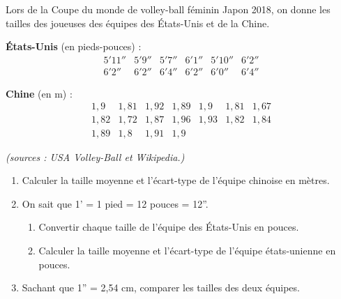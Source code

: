 \begin{exo}
	Lors de la Coupe du monde de volley-ball féminin Japon 2018, on donne les tailles des joueuses des équipes des États-Unis et de la Chine.

	\textbf{États-Unis} (en pieds-pouces) :
	\[
		\begin{array}{cccccc}
			5'11'' & 5'9'' & 5'7'' & 6'1'' & 5'10'' & 6'2'' \\
			6'2''  & 6'2'' & 6'4'' & 6'2'' & 6'0''  & 6'4''
		\end{array}
	\]

	\textbf{Chine} (en m) :
	\[
		\begin{array}{ccccccc}
			1,9  & 1,81 & 1,92 & 1,89 & 1,9  & 1,81 & 1,67 \\
			1,82 & 1,72 & 1,87 & 1,96 & 1,93 & 1,82 & 1,84 \\
			1,89 & 1,8  & 1,91 & 1,9  &      &      &
		\end{array}
	\]

	\hfill{\footnotesize\textit{(sources : USA Volley-Ball et Wikipedia.)}}

	\begin{enumerate}
		\item Calculer la taille moyenne et l'écart-type de l'équipe chinoise en mètres.
		\item On sait que 1' = 1 pied = 12 pouces = 12''.
		      \begin{enumerate}
			      \item Convertir chaque taille de l'équipe des États-Unis en pouces.
			      \item Calculer la taille moyenne et l'écart-type de l'équipe états-unienne en pouces.
		      \end{enumerate}
		\item Sachant que 1'' = 2,54 cm, comparer les tailles des deux équipes.
	\end{enumerate}
\end{exo}
